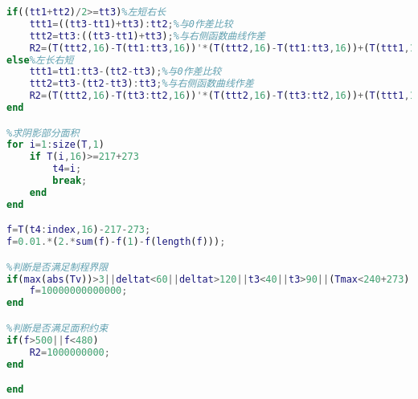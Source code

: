 \documentclass[12pt]{ctexart}
\numberwithin{figure}{section}
\numberwithin{table}{section}
\begin{document}
\begin{lstlisting}[language=MATLAB]
if((tt1+tt2)/2>=tt3)%左短右长
    ttt1=((tt3-tt1)+tt3):tt2;%与0作差比较
    ttt2=tt3:((tt3-tt1)+tt3);%与右侧函数曲线作差
    R2=(T(ttt2,16)-T(tt1:tt3,16))'*(T(ttt2,16)-T(tt1:tt3,16))+(T(ttt1,16)-217-273)'*(T(ttt1,16)-217-273);
else%左长右短
    ttt1=tt1:tt3-(tt2-tt3);%与0作差比较
    ttt2=tt3-(tt2-tt3):tt3;%与右侧函数曲线作差
    R2=(T(ttt2,16)-T(tt3:tt2,16))'*(T(ttt2,16)-T(tt3:tt2,16))+(T(ttt1,16)-217-273)'*(T(ttt1,16)-217-273);
end

%求阴影部分面积
for i=1:size(T,1)
    if T(i,16)>=217+273
        t4=i;
        break;
    end
end

f=T(t4:index,16)-217-273;
f=0.01.*(2.*sum(f)-f(1)-f(length(f)));

%判断是否满足制程界限
if(max(abs(Tv))>3||deltat<60||deltat>120||t3<40||t3>90||(Tmax<240+273)||(Tmax>250+273))
    f=10000000000000;
end

%判断是否满足面积约束
if(f>500||f<480)
    R2=1000000000;
end

end
\end{lstlisting}
\end{document}
